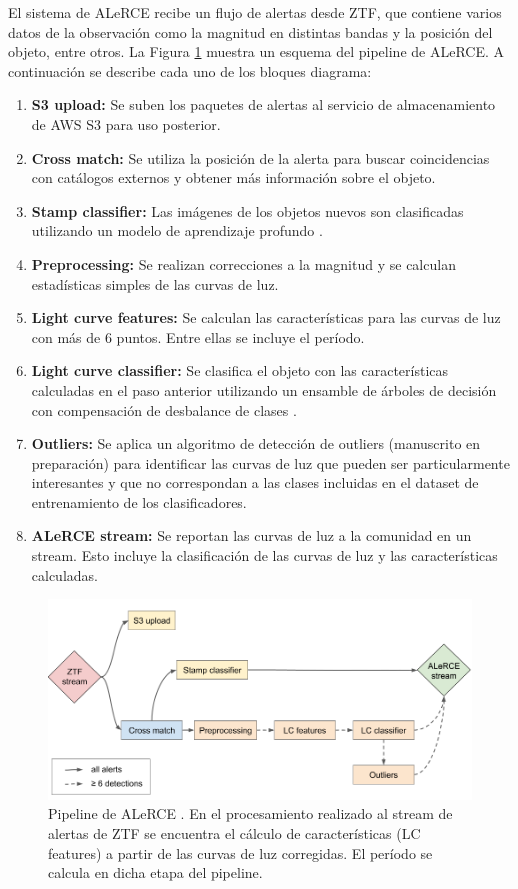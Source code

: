 El sistema de ALeRCE recibe un flujo de alertas desde ZTF, que contiene varios datos de la observación como la magnitud en distintas bandas y la posición del objeto, entre otros. La Figura \ref{fig:pipeline} muestra un esquema del pipeline de ALeRCE. A continuación se describe cada uno de los bloques diagrama:
\begin{enumerate}
    \item  {\bf S3 upload:} Se suben los paquetes de alertas al servicio de almacenamiento de AWS S3 para uso posterior.
    \item {\bf Cross match:} Se utiliza la posición de la alerta para buscar coincidencias con catálogos externos y obtener más información sobre el objeto.
    \item {\bf Stamp classifier:} Las imágenes de los objetos nuevos son clasificadas utilizando un modelo de aprendizaje profundo \cite{carrasco2020alert}.
    \item {\bf Preprocessing:} Se realizan correcciones a la magnitud y se calculan estadísticas simples de las curvas de luz.
    \item {\bf Light curve features:} Se calculan las características para las curvas de luz con más de 6 puntos. Entre ellas se incluye el período.
    \item {\bf Light curve classifier:} Se clasifica el objeto con las características calculadas en el paso anterior utilizando un ensamble de árboles de decisión con compensación de desbalance de clases \cite{lightcurve-classifier}. 
    \item {\bf Outliers:} Se aplica un algoritmo de detección de outliers (manuscrito en preparación) para identificar las curvas de luz que pueden ser particularmente interesantes y que no correspondan a las clases incluidas en el dataset de entrenamiento de los clasificadores.
    \item {\bf ALeRCE stream:} Se reportan las curvas de luz a la comunidad en un stream. Esto incluye la clasificación de las curvas de luz y las características calculadas.
\end{enumerate}

\begin{figure}[t]
    \centering
    \includegraphics[scale=0.45]{pipeline.png}
    \caption{Pipeline de ALeRCE \cite{alerce-intro}. En el procesamiento realizado al stream de alertas de ZTF se encuentra el cálculo de características (LC features) a partir de las curvas de luz corregidas. El período se calcula en dicha etapa del pipeline.}
    \label{fig:pipeline}
\end{figure}

